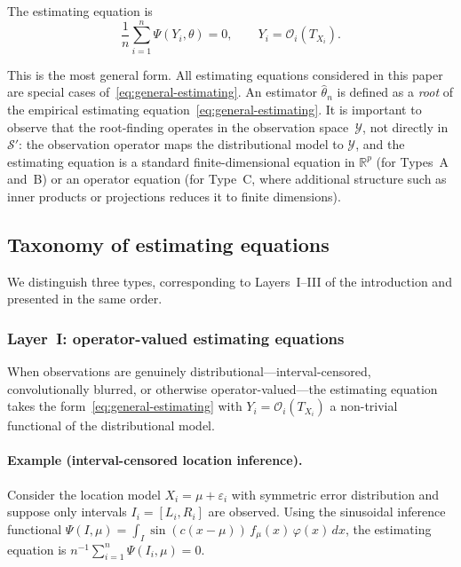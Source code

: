 \documentclass[11pt,a4paper]{article}
\newcommand{\R}{\mathbb{R}}
\begin{document}
The estimating equation is
\begin{equation}\label{eq:general-estimating}
\frac{1}{n} \sum_{i=1}^n \Psi(Y_i, \theta) = 0,
\qquad Y_i = \mathcal O_i(T_{X_i}).
\end{equation}

This is the most general form.  All estimating equations considered in this
paper are special cases of~\eqref{eq:general-estimating}.
An estimator $\hat\theta_n$ is defined as a \emph{root} of the empirical
estimating equation~\eqref{eq:general-estimating}.  It is important to
observe that the root-finding operates in the observation space~$\mathcal Y$,
not directly in~$\mathcal S'$: the observation operator maps the
distributional model to $\mathcal Y$, and the estimating equation is a
standard finite-dimensional equation in $\R^p$ (for Types~A and~B) or an
operator equation (for Type~C, where additional structure such as inner
products or projections reduces it to finite dimensions).

\subsection{Taxonomy of estimating equations}\label{subsec:taxonomy}

We distinguish three types, corresponding to Layers~I--III of the
introduction and presented in the same order.

\subsubsection*{Layer~I: operator-valued estimating equations}

When observations are genuinely distributional---interval-censored,
convolutionally blurred, or otherwise operator-valued---the estimating
equation takes the form~\eqref{eq:general-estimating} with
$Y_i = \mathcal O_i(T_{X_i})$ a non-trivial functional of the distributional model.

\paragraph{Example (interval-censored location inference).}
Consider the location model $X_i = \mu + \varepsilon_i$ with symmetric
error distribution and suppose only intervals $I_i = [L_i, R_i]$ are
observed.  Using the sinusoidal inference functional
$\Psi(I, \mu) = \int_I \sin(c(x - \mu))\,f_\mu(x)\,\varphi(x)\,dx$,
the estimating equation is
$n^{-1}\sum_{i=1}^n \Psi(I_i, \mu) = 0$.
\end{document}
